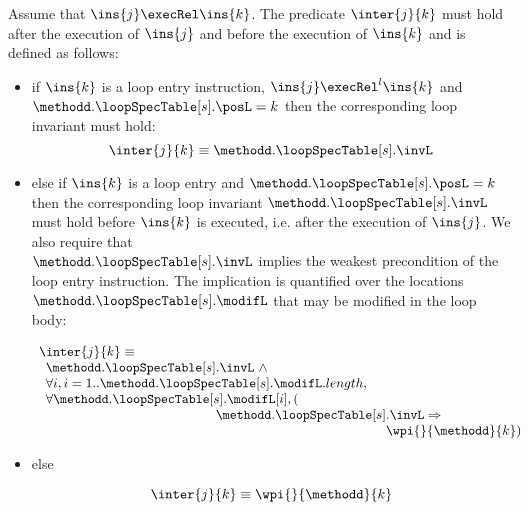 \begin{defInter}\label{inter} 
Assume that $\ins{j} \execRel \ins{k}$. The predicate $\inter{j}{k}$ must hold after the execution of $\ins{j}$ and before the execution of 
$\ins{k}$ and is defined as follows:
\begin{itemize}
\item if $\ins{k}$ is a loop entry instruction,  $\ins{j} \execRel^l \ins{k}$ and  $ \methodd.\loopSpecTable[s].\posL = k $
then the corresponding loop invariant  must hold:
$$
\inter{j}{k} \equiv  \methodd.\loopSpecTable[s].\invL
$$


\item else if $\ins{k}$  is a loop entry  and  $ \methodd.\loopSpecTable[s].\posL = k $ 
then the corresponding loop invariant $ \methodd.\loopSpecTable[s].\invL$  must hold before $\ins{k}$ is executed, 
i.e. after the execution of $\ins{j}$. We also require that \\
$\methodd.\loopSpecTable[s].\invL$ implies the weakest precondition of the loop entry instruction. 
The implication is quantified over the locations $ \methodd.\loopSpecTable[s].\modifL $ that may be modified in the loop body:

$$\begin{array}{l} \inter{j}{k} \equiv \\ \begin{array}{l}
          \methodd.\loopSpecTable[s].\invL \ \wedge \\
          \forall i , i = 1.. \methodd.\loopSpecTable[s].\modifL.length ,\\
          \forall  \methodd.\loopSpecTable[s].\modifL[i], (\\
	  \phantom{ \methodd.\loopSpecTable[s] }  \methodd.\loopSpecTable[s].\invL \Rightarrow \\
	  \phantom{ \methodd.\loopSpecTable[s]  \methodd.\loopSpecTable[s] } \wpi{ }{ \methodd }{k} ) 
 \end{array}
 \end{array}  $$

\item else 

$$\inter{j}{k} \equiv \wpi{ }{\methodd}{k}$$
\end{itemize}
\end{defInter}
